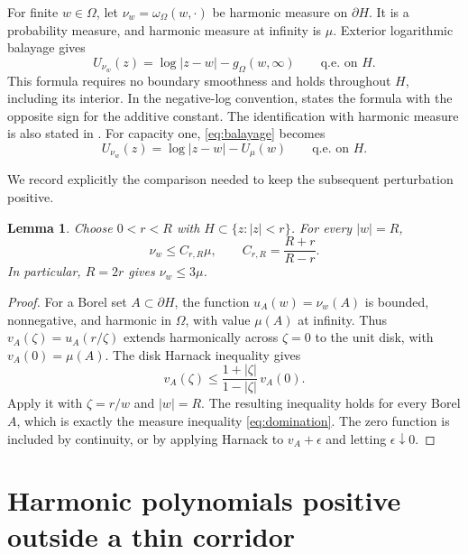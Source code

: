 \documentclass[11pt]{article}
\newcommand{\qe}{\text{q.e.}}
\newtheorem{lemma}[theorem]{Lemma}
\theoremstyle{remark}
\numberwithin{equation}{section}
\begin{document}
For finite $w\in\Omega$, let $\nu_w=\omega_\Omega(w,\cdot)$ be
harmonic measure on $\partial H$. It is a probability measure, and
harmonic measure at infinity is $\mu$. Exterior logarithmic balayage
gives
\begin{equation}\label{eq:balayage}
 U_{\nu_w}(z)=\log|z-w|-g_\Omega(w,\infty)
 \qquad\qe\text{ on }H.
\end{equation}
This formula requires no boundary smoothness and holds throughout
$H$, including its interior. In the negative-log convention,
\cite[eqs.~(3.15)--(3.16), pp.~188--189]{Saff2010} states the formula
with the opposite sign for the additive constant. The identification
with harmonic measure is also stated in
\cite[Section~2, eq.~(2.4)]{Tookos2005}.
For capacity one, \eqref{eq:balayage} becomes
\begin{equation}\label{eq:balayage-one}
 U_{\nu_w}(z)=\log|z-w|-U_\mu(w)
 \qquad\qe\text{ on }H.
\end{equation}

We record explicitly the comparison needed to keep the subsequent
perturbation positive.

\begin{lemma}\label{lem:harnack}
Choose $0<r<R$ with $H\subset\{z:|z|<r\}$. For every $|w|=R$,
\begin{equation}\label{eq:domination}
 \nu_w\le C_{r,R}\mu,\qquad C_{r,R}=\frac{R+r}{R-r}.
\end{equation}
In particular, $R=2r$ gives $\nu_w\le3\mu$.
\end{lemma}

\begin{proof}
For a Borel set $A\subset\partial H$, the function
$u_A(w)=\nu_w(A)$ is bounded, nonnegative, and harmonic in $\Omega$,
with value $\mu(A)$ at infinity. Thus
$v_A(\zeta)=u_A(r/\zeta)$ extends harmonically across $\zeta=0$
to the unit disk, with $v_A(0)=\mu(A)$.
The disk Harnack inequality gives
\[
 v_A(\zeta)\le\frac{1+|\zeta|}{1-|\zeta|}\,v_A(0).
\]
Apply it with $\zeta=r/w$ and $|w|=R$.
The resulting inequality holds for every Borel $A$, which is exactly
the measure inequality \eqref{eq:domination}. The zero function is
included by continuity, or by applying Harnack to $v_A+\epsilon$
and letting $\epsilon\downarrow0$.
\end{proof}

\section{Harmonic polynomials positive outside a thin corridor}
\label{sec:corridor}
\end{document}

